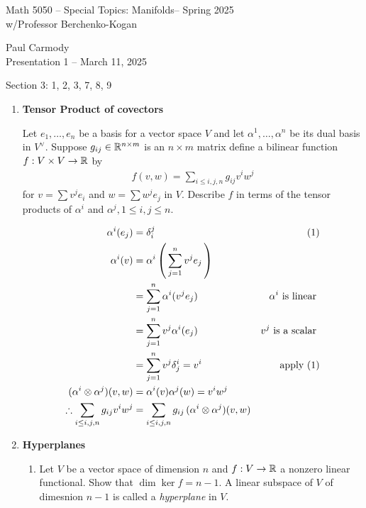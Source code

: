 \documentclass[10pt,a4paper]{report}
\newcommand{\CLASSNAME}{Math 5050 -- Special Topics: Manifolds}
\newcommand{\STUDENTNAME}{Paul Carmody}
\newcommand{\ASSIGNMENT}{Presentation 1 }
\newcommand{\DUEDATE}{March 11, 2025}
\newcommand{\SEMESTER}{Spring 2025}
\newcommand{\BLUE}[1]{\textcolor{blue}{#1}}
\begin{document}
\begin{center}
	\Large{\CLASSNAME -- \SEMESTER} \\
	\large{ w/Professor Berchenko-Kogan}
\end{center}
\begin{center}
	\STUDENTNAME \\
	\ASSIGNMENT -- \DUEDATE\\
\end{center} 

\noindent Section 3: 1, 2, 3, 7, 8, 9\\

\begin{enumerate}[label=3.\arabic*.]

	\item \textbf{Tensor Product of covectors}
	
	Let $e_1, \dots, e_n$ be a basis for a vector space $V$ and let $\alpha^1, \dots, \alpha^n$ be its dual basis in $V^\vee$.  Suppose $g_{ij}\in \mathbb{R}^{n\times m}$ is an $n \times m$ matrix define a bilinear function $f: V\times V \to \mathbb{R}$ by 
	\begin{align*}
		f(v,w) = \sum_{i\le i,j, n} g_{ij}v^i w^j
	\end{align*}for $v=\sum v^j e_i$ and $w=\sum w^j e_j$ in $V$.  Describe $f$ in terms of the tensor products of $\alpha^i$ and $\alpha^j, 1 \le i,j \le n$.
	
	\BLUE{\begin{align*}
		\alpha^i(e_j) &= \delta^j_i & (1)\\
		\alpha^i(v) &= \alpha^i\left (\, \sum_{j=1}^n v^je_j \,\right ) \\
		 & =\sum_{j=1}^n \alpha^i(v^je_j) & \alpha^i \text{ is linear } \\
		 & =\sum_{j=1}^n v^j\alpha^i(e_j) & v^j \text{ is a scalar }\\
		 & =\sum_{j=1}^n v^j\delta^i_j=v^i & \text{apply (1)}\\
		(\alpha^i\otimes\alpha^j)(v,w) &= \alpha^i(v)\alpha^j(w) = v^iw^j\\
		\therefore \sum_{i\le i,j, n} g_{ij}v^i w^j &= \sum_{i\le i,j, n} g_{ij}\,(\alpha^i\otimes\alpha^j)(v,w) 
	\end{align*}
	}
	
	\item \textbf{Hyperplanes}
	
	\begin{enumerate}[label=(\alph*)]
	
		\item Let $V$ be a vector space of dimension $n$ and $f:V \to \mathbb{R}$ a nonzero linear functional.  Show that $\dim\ker f = n-1$.  A linear subspace of $V$ of dimesnion $n-1$ is called a \textit{hyperplane} in $V$.
		

\end{enumerate}
\end{enumerate}
\end{document}

